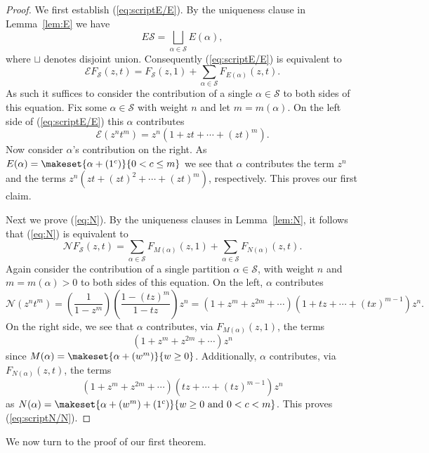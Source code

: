 \documentclass{article}
\theoremstyle{plain}
\theoremstyle{definition}
\newcommand{\N}{\mathcal{N}}
\newcommand{\E}{\mathcal{E}}
\renewcommand{\S}{\mathcal{S}}
\begin{document}
\begin{proof}
	We first establish (\ref{eq:scriptE/E}).  By the uniqueness clause in Lemma~\ref{lem:E} we have 
	$$E\S = \bigsqcup_{\alpha\in \S} E(\alpha),$$
	where $\sqcup$ denotes disjoint union.  Consequently (\ref{eq:scriptE/E}) is equivalent to 
$$\E F_{\S}(z,t) = F_{\S}(z,1) + \sum_{\alpha\in \S} F_{E(\alpha)}(z,t).$$
	As such it suffices to consider the contribution of a single $\alpha\in \S$ to both sides of this equation.  Fix some $\alpha\in \S$ with weight $n$ and  let $m=m(\alpha)$.  On the left side of (\ref{eq:scriptE/E}) this $\alpha$ contributes 
	$$\E(z^nt^m) = z^n(1+ zt + \cdots + (zt)^m).$$   
Now consider $\alpha$'s contribution on the right. As $E(\alpha) = \makeset{\alpha+(1^c)}{0<c\leq m}$ we see that $\alpha$ contributes the term $z^n$ and the terms $z^n(zt+(zt)^2+\cdots + (zt)^m)$, respectively.  This proves our first claim.  
	
Next we prove (\ref{eq:N}).  By the uniqueness clauses in Lemma~\ref{lem:N}, it follows that (\ref{eq:N}) is equivalent to  
$$\N F_{\S}(z,t) = \sum_{\alpha\in \S} F_{M(\alpha)}(z,1) + \sum_{\alpha\in \S} F_{N(\alpha)}(z,t).$$
Again consider the contribution of a single partition $\alpha\in\S$, with weight $n$ and $m = m(\alpha)>0$ to both sides of this equation.  On the left, $\alpha$ contributes 
$$\N(z^nt^m) =\left(\frac{1}{1-z^m}\right)\left(\frac{1-(tz)^m}{1-tz}\right)z^n =(1+z^m+z^{2m}+\cdots)(1+ tz + \cdots + (tx)^{m-1})z^n.$$
On the right side, we see that $\alpha$ contributes, via $F_{M(\alpha)}(z,1)$, the terms 
$$(1+z^m+z^{2m}+\cdots)z^n$$ 
since $M(\alpha) = \makeset{\alpha+ (w^m)}{w\geq 0}$.  Additionally, $\alpha$ contributes, via  $F_{N(\alpha)}(z,t)$, the terms
$$(1+z^m+z^{2m}+\cdots)(tz + \cdots + (tz)^{m-1})z^n$$
as $N(\alpha) = \makeset{\alpha+ (w^m) + (1^c)}{w\geq 0\textrm{ and } 0<c<m}$.  This proves (\ref{eq:scriptN/N}).  
\end{proof}



We now turn to the proof of our first theorem.  
\end{document}
